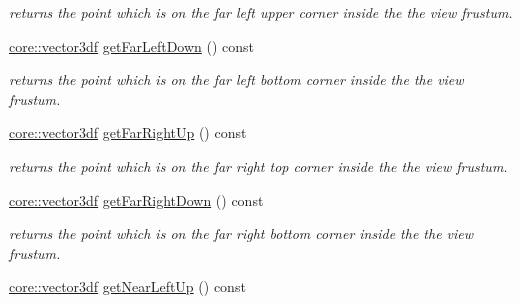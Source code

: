 \begin{DoxyCompactItemize}
\begin{DoxyCompactList}\small\item\em returns the point which is on the far left upper corner inside the the view frustum. \end{DoxyCompactList}\item 
\hyperlink{namespaceirr_1_1core_a06f169d08b5c429f5575acb7edbad811}{core\+::vector3df} \hyperlink{structirr_1_1scene_1_1SViewFrustum_a9a79eb4430af41031850adc7a0e0e3cf}{get\+Far\+Left\+Down} () const \hypertarget{structirr_1_1scene_1_1SViewFrustum_a9a79eb4430af41031850adc7a0e0e3cf}{}\label{structirr_1_1scene_1_1SViewFrustum_a9a79eb4430af41031850adc7a0e0e3cf}

\begin{DoxyCompactList}\small\item\em returns the point which is on the far left bottom corner inside the the view frustum. \end{DoxyCompactList}\item 
\hyperlink{namespaceirr_1_1core_a06f169d08b5c429f5575acb7edbad811}{core\+::vector3df} \hyperlink{structirr_1_1scene_1_1SViewFrustum_a1b7f3b1cd4da4ea886b77d674e1c17dd}{get\+Far\+Right\+Up} () const \hypertarget{structirr_1_1scene_1_1SViewFrustum_a1b7f3b1cd4da4ea886b77d674e1c17dd}{}\label{structirr_1_1scene_1_1SViewFrustum_a1b7f3b1cd4da4ea886b77d674e1c17dd}

\begin{DoxyCompactList}\small\item\em returns the point which is on the far right top corner inside the the view frustum. \end{DoxyCompactList}\item 
\hyperlink{namespaceirr_1_1core_a06f169d08b5c429f5575acb7edbad811}{core\+::vector3df} \hyperlink{structirr_1_1scene_1_1SViewFrustum_add04c29bfa22d94be96c92ecff5420b9}{get\+Far\+Right\+Down} () const \hypertarget{structirr_1_1scene_1_1SViewFrustum_add04c29bfa22d94be96c92ecff5420b9}{}\label{structirr_1_1scene_1_1SViewFrustum_add04c29bfa22d94be96c92ecff5420b9}

\begin{DoxyCompactList}\small\item\em returns the point which is on the far right bottom corner inside the the view frustum. \end{DoxyCompactList}\item 
\hyperlink{namespaceirr_1_1core_a06f169d08b5c429f5575acb7edbad811}{core\+::vector3df} \hyperlink{structirr_1_1scene_1_1SViewFrustum_af240a13958215ce0cbe6ccd75301828a}{get\+Near\+Left\+Up} () const \hypertarget{structirr_1_1scene_1_1SViewFrustum_af240a13958215ce0cbe6ccd75301828a}{}\label{structirr_1_1scene_1_1SViewFrustum_af240a13958215ce0cbe6ccd75301828a}


\end{DoxyCompactItemize}
